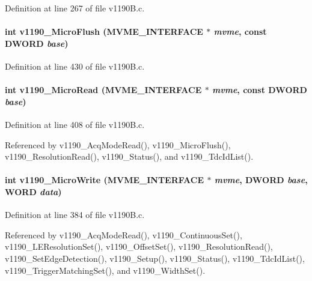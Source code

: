 Definition at line 267 of file v1190B.c.
\paragraph[{v1190\_\-MicroFlush}]{\setlength{\rightskip}{0pt plus 5cm}int v1190\_\-MicroFlush ({\bf MVME\_\-INTERFACE} $\ast$ {\em mvme}, \/  const {\bf DWORD} {\em base})}\hfill\label{v1190B_8c_aa6115ff03a198f775fd364cf4cb191fe}


Definition at line 430 of file v1190B.c.
\paragraph[{v1190\_\-MicroRead}]{\setlength{\rightskip}{0pt plus 5cm}int v1190\_\-MicroRead ({\bf MVME\_\-INTERFACE} $\ast$ {\em mvme}, \/  const {\bf DWORD} {\em base})}\hfill\label{v1190B_8c_a25b20b373e9dad2da095572a6b66d7db}


Definition at line 408 of file v1190B.c.

Referenced by v1190\_\-AcqModeRead(), v1190\_\-MicroFlush(), v1190\_\-ResolutionRead(), v1190\_\-Status(), and v1190\_\-TdcIdList().
\paragraph[{v1190\_\-MicroWrite}]{\setlength{\rightskip}{0pt plus 5cm}int v1190\_\-MicroWrite ({\bf MVME\_\-INTERFACE} $\ast$ {\em mvme}, \/  {\bf DWORD} {\em base}, \/  {\bf WORD} {\em data})}\hfill\label{v1190B_8c_a667677df1f9f764336db2953dc1e27b9}


Definition at line 384 of file v1190B.c.

Referenced by v1190\_\-AcqModeRead(), v1190\_\-ContinuousSet(), v1190\_\-LEResolutionSet(), v1190\_\-OffsetSet(), v1190\_\-ResolutionRead(), v1190\_\-SetEdgeDetection(), v1190\_\-Setup(), v1190\_\-Status(), v1190\_\-TdcIdList(), v1190\_\-TriggerMatchingSet(), and v1190\_\-WidthSet().
